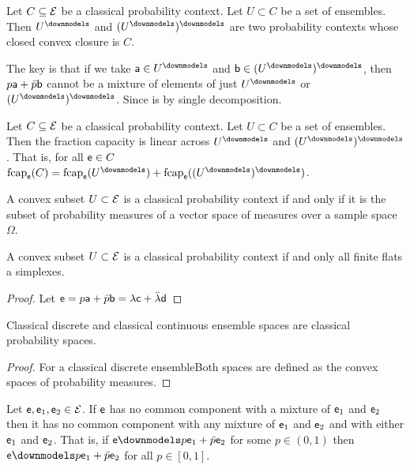\begin{conj}
	Let $C \subseteq \Ens$ be a classical probability context. Let $U \subset C$ be a set of ensembles. Then $U^\separate$ and $(U^\separate)^\separate$ are two probability contexts whose closed convex closure is $C$.
\end{conj}

\begin{remark}
	The key is that if we take $\ens[a] \in U^\separate$ and $\ens[b] \in (U^\separate)^\separate$, then $p \ens[a] + \bar{p}\ens[b]$ cannot be a mixture of elements of just $U^\separate$ or $(U^\separate)^\separate$. Since is by single decomposition.
\end{remark}

\begin{conj}
	Let $C \subseteq \Ens$ be a classical probability context. Let $U \subset C$ be a set of ensembles. Then the fraction capacity is linear across $U^\separate$ and $(U^\separate)^\separate$. That is, for all $\ens \in C$ $\fcap_{\ens}(C) = \fcap_{\ens}(U^\separate) + \fcap_{\ens}((U^\separate)^\separate)$.
\end{conj}

\begin{prop}
	A convex subset $U \subset \Ens$ is a classical probability context if and only if it is the subset of probability measures of a vector space of measures over a sample space $\Omega$.
\end{prop}

\begin{prop}
	A convex subset $U \subset \Ens$ is a classical probability context if and only all finite flats a simplexes.
\end{prop}

\begin{proof}
	Let $\ens = p \ens[a] + \bar{p} \ens[b] = \lambda \ens[c] +\bar{\lambda} \ens[d]$
\end{proof}

\begin{coro}
	Classical discrete and classical continuous ensemble spaces are classical probability spaces.
\end{coro}

\begin{proof}
	For a classical discrete ensembleBoth spaces are defined as the convex spaces of probability measures.
\end{proof}

\begin{prop}\label{pm_es_separateExtendsMixtures}
	Let $\ens,\ens_1,\ens_2 \in \Ens$. If $\ens$ has no common component with a mixture of $\ens_1$ and $\ens_2$ then it has no common component with any mixture of $\ens_1$ and $\ens_2$ and with either $\ens_1$ and $\ens_2$. That is, if $\ens \separate p \ens_1 + \bar{p} \ens_2$ for some $p \in (0, 1)$ then $\ens \separate p \ens_1 + \bar{p} \ens_2$ for all $p \in [0, 1]$.
\end{prop}

